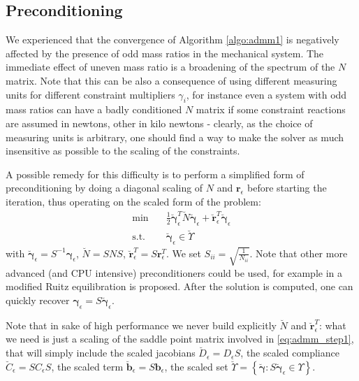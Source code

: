 \documentclass[AMA,STIX1COL]{WileyNJD-v2}
\newcommand{\vect}[1]{\bm{#1}}
\begin{document}
\subsection{Preconditioning}

We experienced that the convergence of Algorithm \ref{algo:admm1} is negatively affected by the presence of odd mass ratios in the mechanical system. The immediate effect of uneven mass ratio is a broadening of the spectrum of the $N$ matrix. Note that this can be also a consequence of using different measuring units for different constraint multipliers $\gamma_i$, for instance even a system with odd mass ratios can have a badly conditioned $N$ matrix if some constraint reactions are assumed in newtons, other in kilo newtons - clearly, as the choice of measuring units is arbitrary, one should find a way to make the solver as much insensitive as possible to the scaling of the constraints. 

A possible remedy for this difficulty is to perform a simplified form of preconditioning by doing a diagonal scaling of $N$ and $\vect{r}_\epsilon$ before starting the iteration, thus operating on the scaled form of the problem:
%
\begin{align}
	\text{min} \quad & \frac{1}{2} \breve{\vect{\gamma}}_\epsilon^T \breve{N} \breve{\vect{\gamma}}_\epsilon + \breve{\vect{r}}^T_\epsilon \breve{\vect{\gamma}}_\epsilon \\
	\text{s.t.} \quad & \breve{\vect{\gamma}}_\epsilon \in \breve{\Upsilon} 
	\label{eq:ChronoCCP_min_scaled}
\end{align}
%
with $\breve{\vect{\gamma}}_\epsilon = S^{-1} \vect{\gamma}_\epsilon$, $\breve{N} = S N S$, 
$\breve{\vect{r}}^T_\epsilon = S \vect{r}^T_\epsilon$. 
We set $S_{ii} = \sqrt{\frac{1}{N_{ii}}}$. 
Note that other more advanced (and CPU intensive) preconditioners could be used, for example in \cite{Stellato2020} a modified Ruitz equilibration is proposed.  
After the solution is computed, one can quickly recover $\vect{\gamma}_\epsilon = S \breve{\vect{\gamma}}_\epsilon$. 

Note that in sake of high performance we never build explicitly $\breve{N}$ and $\breve{\vect{r}}^T_\epsilon$: what we need is just a scaling of the saddle point matrix involved in \eqref{eq:admm_step1}, that will simply include the scaled jacobians
$\breve{D}_\epsilon = D_\epsilon S$, the scaled compliance
$\breve{C}_\epsilon = S C_\epsilon S$,  the scaled term 
$\breve{\vect{b}}_\epsilon = S \vect{b}_\epsilon$, the scaled set
$\breve{\Upsilon} = \left\{ \breve{\vect{\gamma}} : S \breve{\vect{\gamma}}_\epsilon \in \Upsilon  \right\}$.
\end{document}

